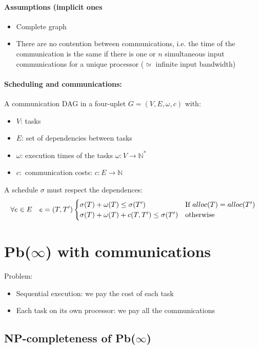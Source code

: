 \paragraph{Assumptions (implicit ones}
\begin{itemize}
\item Complete graph
\item There are no contention between communications, i.e. the time of the communication is the same if there is one or $n$ simultaneous input communications for a unique processor ($\simeq$ infinite input bandwidth)
\end{itemize}

\paragraph{Scheduling and communications:} A communication DAG in a four-uplet $G=(V,E,\omega,c)$ with:
\begin{itemize}
\item $V$: tasks
\item $E$: set of dependencies between tasks
\item $\omega$: execution times of the tasks $\omega: V \to \mathbb{N}^*$
\item $c:$ communication costs: $c:E\to \mathbb{N}$
\end{itemize}


A schedule $\sigma$ must respect the dependences:
\[
\forall e \in E \quad e=(T,T') 
\begin{cases}
\sigma(T)+\omega(T)\leq \sigma(T') & $If $alloc(T)=alloc(T')\\
\sigma(T) + \omega(T)+c(T,T')\leq \sigma(T') & $otherwise$
\end{cases}\]

\section{Pb($\infty$) with communications}
Problem:
\begin{itemize}
\item Sequential execution: we pay the cost of each task
\item Each task on its own processor: we pay all the communications
\end{itemize}

\subsection{NP-completeness of Pb($\infty$)}
